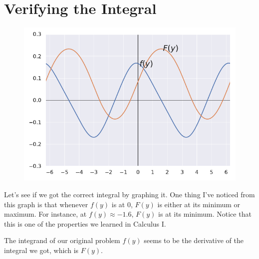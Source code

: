 \section*{Verifying the Integral}

\begin{figure}
	\centering
	\caption[Figure 1. The integrand and the integral.]{}
	\includegraphics[width=0.7\linewidth]{graph_1}
	\label{fig:graph1}
\end{figure}

Let's see if we got the correct integral
by graphing it. One thing I've noticed
from this graph is that whenever $ f(y) $ is at $ 0 $, 
$ F(y) $ is either at its minimum or maximum.
For instance, at $ f(y) \approx -1.6 $,
$F(y)$ is at its minimum.
Notice that this is one of the properties we learned
in Calculus I. 

The integrand
of our original problem $ f(y) $ seems to be the
derivative of the integral we got, which is $ F(y) $.